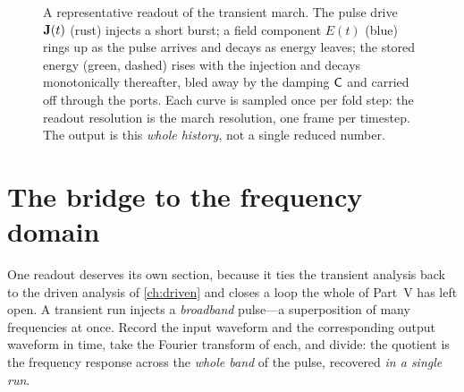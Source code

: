 \begin{figure}[t]
\centering
{}
\caption[A transient field and energy trajectory]{A representative readout of the
transient march. The pulse drive $\mathbf{J}(t)$ (rust) injects a short burst; a field
component $E(t)$ (blue) rings up as the pulse arrives and decays as energy leaves;
the stored energy (green, dashed) rises with the injection and decays monotonically
thereafter, bled away by the damping $\mathsf{C}$ and carried off through the ports. Each
curve is sampled once per fold step: the readout resolution is the march resolution,
one frame per timestep. The output is this \emph{whole history}, not a single
reduced number.}
\label{fig:tr-energy}
\end{figure}

\section{The bridge to the frequency domain}
\label{sec:tr-fourier}

One readout deserves its own section, because it ties the transient analysis back
to the driven analysis of \cref{ch:driven} and closes a loop the whole of Part~V has
left open. A transient run injects a \emph{broadband} pulse---a superposition of
many frequencies at once. Record the input waveform and the corresponding output
waveform in time, take the Fourier transform of each, and divide: the quotient is
the frequency response across the \emph{whole band} of the pulse, recovered \emph{in
a single run}.

